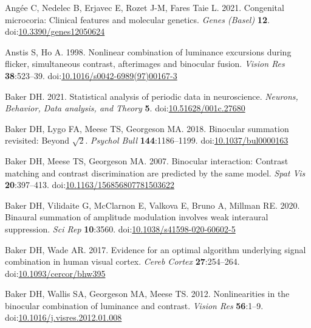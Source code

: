 \documentclass[
]{article}
\newlength{\cslhangindent}
\newlength{\cslentryspacingunit} %
\newenvironment{CSLReferences}[2] %
 {%
  \setlength{\parindent}{0pt}
  \ifodd #1
  \let\oldpar\par
  \def\par{\hangindent=\cslhangindent\oldpar}
  \fi
  \setlength{\parskip}{#2\cslentryspacingunit}
 }%
 {}
\begin{document}
\hypertarget{refs}{}
\begin{CSLReferences}{1}{0}
\leavevmode{}%
Angée C, Nedelec B, Erjavec E, Rozet J-M, Fares Taie L. 2021. Congenital microcoria: Clinical features and molecular genetics. \emph{Genes (Basel)} \textbf{12}. doi:\href{https://doi.org/10.3390/genes12050624}{10.3390/genes12050624}

\leavevmode{}%
Anstis S, Ho A. 1998. Nonlinear combination of luminance excursions during flicker, simultaneous contrast, afterimages and binocular fusion. \emph{Vision Res} \textbf{38}:523--39. doi:\href{https://doi.org/10.1016/s0042-6989(97)00167-3}{10.1016/s0042-6989(97)00167-3}

\leavevmode{}%
Baker DH. 2021. Statistical analysis of periodic data in neuroscience. \emph{Neurons, Behavior, Data analysis, and Theory} \textbf{5}. doi:\href{https://doi.org/10.51628/001c.27680}{10.51628/001c.27680}

\leavevmode{}%
Baker DH, Lygo FA, Meese TS, Georgeson MA. 2018. Binocular summation revisited: Beyond \(\sqrt{2}\). \emph{Psychol Bull} \textbf{144}:1186--1199. doi:\href{https://doi.org/10.1037/bul0000163}{10.1037/bul0000163}

\leavevmode{}%
Baker DH, Meese TS, Georgeson MA. 2007. Binocular interaction: Contrast matching and contrast discrimination are predicted by the same model. \emph{Spat Vis} \textbf{20}:397--413. doi:\href{https://doi.org/10.1163/156856807781503622}{10.1163/156856807781503622}

\leavevmode{}%
Baker DH, Vilidaite G, McClarnon E, Valkova E, Bruno A, Millman RE. 2020. Binaural summation of amplitude modulation involves weak interaural suppression. \emph{Sci Rep} \textbf{10}:3560. doi:\href{https://doi.org/10.1038/s41598-020-60602-5}{10.1038/s41598-020-60602-5}

\leavevmode{}%
Baker DH, Wade AR. 2017. Evidence for an optimal algorithm underlying signal combination in human visual cortex. \emph{Cereb Cortex} \textbf{27}:254--264. doi:\href{https://doi.org/10.1093/cercor/bhw395}{10.1093/cercor/bhw395}

\leavevmode{}%
Baker DH, Wallis SA, Georgeson MA, Meese TS. 2012. Nonlinearities in the binocular combination of luminance and contrast. \emph{Vision Res} \textbf{56}:1--9. doi:\href{https://doi.org/10.1016/j.visres.2012.01.008}{10.1016/j.visres.2012.01.008}


\end{CSLReferences}
\end{document}
